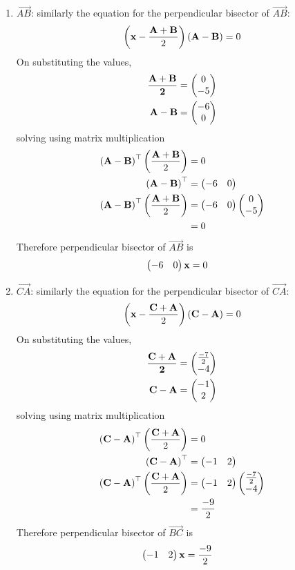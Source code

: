 \documentclass[11pt]{book}
\begin{document}
\begin{enumerate}[label=\thesection.\arabic*.,ref=\thesection.\theenumi]
\begin{enumerate}
  \item $\vec{AB}$: similarly the equation for the perpendicular bisector of $\vec{AB}$:
\begin{align}
    \left(\mathbf{x}-\frac{\mathbf{A}+\mathbf{B}}{2}\right)\left(\mathbf{A}-\mathbf{B}\right) = 0
\end{align}
On substituting the values,
\begin{align}
    \mathbf{\frac{\mathbf{A}+\mathbf{B}}{2}} &= \begin{pmatrix}0 \\ -5\end{pmatrix} \\
\mathbf{A}-\mathbf{B} &= \begin{pmatrix}-6 \\ 0\end{pmatrix} \\
\end{align}
solving using matrix multiplication
\begin{align}
\left(\mathbf{A}-\mathbf{B}\right)^{\top}\left(\frac{\mathbf{A}+\mathbf{B}}{2}\right)&=0 \\
\left(\mathbf{A}-\mathbf{B}\right)^{\top} &= \begin{pmatrix}-6 & 0\end{pmatrix} \\
\left(\mathbf{A}-\mathbf{B}\right)^{\top}\left(\frac{\mathbf{A}+\mathbf{B}}{2}\right)&=\begin{pmatrix}-6 & 0\end{pmatrix}\begin{pmatrix}0 \\ -5\end{pmatrix}\\
&= 0
\end{align}
Therefore perpendicular bisector of $\vec{AB}$ is
\begin{align}
    \begin{pmatrix}-6 & 0\end{pmatrix}\mathbf{x}&= 0
\end{align}

  \item $\vec{CA}$: similarly the equation for the perpendicular bisector of $\vec{CA}$:
\begin{align}
    \left(\mathbf{x}-\frac{\mathbf{C}+\mathbf{A}}{2}\right)\left(\mathbf{C}-\mathbf{A}\right) = 0
\end{align}
On substituting the values,
\begin{align}
    \mathbf{\frac{\mathbf{C}+\mathbf{A}}{2}} &= \begin{pmatrix}\frac{-7}{2} \\ -4\end{pmatrix} \\
\mathbf{C}-\mathbf{A} &= \begin{pmatrix}-1 \\ 2\end{pmatrix} \\
\end{align}
solving using matrix multiplication
\begin{align}
\left(\mathbf{C}-\mathbf{A}\right)^{\top}\left(\frac{\mathbf{C}+\mathbf{A}}{2}\right)&=0 \\
\left(\mathbf{C}-\mathbf{A}\right)^{\top} &= \begin{pmatrix}-1 & 2\end{pmatrix} \\
\left(\mathbf{C}-\mathbf{A}\right)^{\top}\left(\frac{\mathbf{C}+\mathbf{A}}{2}\right)&=\begin{pmatrix}-1 & 2\end{pmatrix}\begin{pmatrix}\frac{-7}{2} \\ -4\end{pmatrix}\\
&= \frac{-9}{2}
\end{align}
Therefore perpendicular bisector of $\vec{BC}$ is
\begin{align}
    \begin{pmatrix}-1 & 2\end{pmatrix}\mathbf{x}&= \frac{-9}{2}
\end{align}
\end{enumerate}


\end{enumerate}
\end{document}
